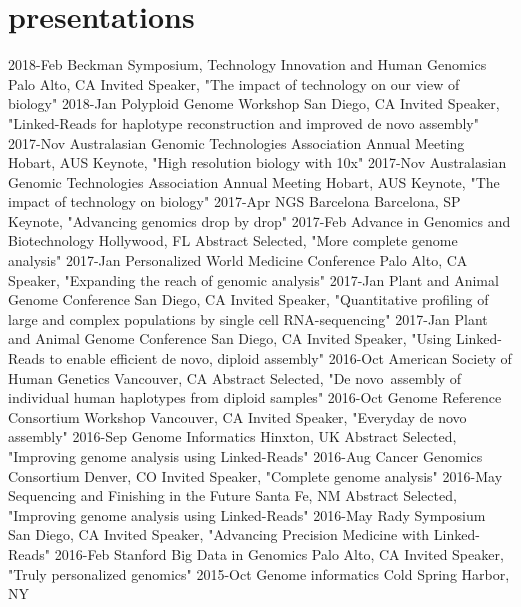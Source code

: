 \documentclass[]{dmc-cv} %
\begin{document}
\section{presentations}
\begin{entrylist}
\entry
{2018-Feb}
{Beckman Symposium, Technology Innovation and Human Genomics}
{Palo Alto, CA}
{Invited Speaker, "The impact of technology on our view of biology"}
\entry
{2018-Jan}
{Polyploid Genome Workshop}
{San Diego, CA}
{Invited Speaker, "Linked-Reads for haplotype reconstruction and improved de novo assembly"}
\entry
{2017-Nov}
{Australasian Genomic Technologies Association Annual Meeting}
{Hobart, AUS}
{Keynote, "High resolution biology with 10x"}
\entry
{2017-Nov}
{Australasian Genomic Technologies Association Annual Meeting}
{Hobart, AUS}
{Keynote, "The impact of technology on biology"}
\entry
{2017-Apr}
{NGS Barcelona}
{Barcelona, SP}
{Keynote, "Advancing genomics drop by drop"}
\entry
{2017-Feb}
{Advance in Genomics and Biotechnology}
{Hollywood, FL}
{Abstract Selected, "More complete genome analysis"}
\entry
{2017-Jan}
{Personalized World Medicine Conference}
{Palo Alto, CA}
{Speaker, "Expanding the reach of genomic analysis"}
\entry
{2017-Jan}
{Plant and Animal Genome Conference}
{San Diego, CA}
{Invited Speaker, "Quantitative profiling of large and complex populations by single cell RNA-sequencing"}
\entry
{2017-Jan}
{Plant and Animal Genome Conference}
{San Diego, CA}
{Invited Speaker, "Using Linked-Reads to enable efficient de novo, diploid assembly"}
\entry
{2016-Oct}
{American Society of Human Genetics}
{Vancouver, CA}
{Abstract Selected, "De novo assembly of individual human haplotypes from diploid samples"}
\entry
{2016-Oct}
{Genome Reference Consortium Workshop}
{Vancouver, CA}
{Invited Speaker, "Everyday de novo assembly"}
\entry
{2016-Sep}
{Genome Informatics}
{Hinxton, UK}
{Abstract Selected, "Improving genome analysis using Linked-Reads"}
\entry
{2016-Aug}
{Cancer Genomics Consortium}
{Denver, CO}
{Invited Speaker, "Complete genome analysis"}
\entry
{2016-May}
{Sequencing and Finishing in the Future}
{Santa Fe, NM}
{Abstract Selected, "Improving genome analysis using Linked-Reads"}
\entry
{2016-May}
{Rady Symposium}
{San Diego, CA}
{Invited Speaker, "Advancing Precision Medicine with Linked-Reads"}
\entry
{2016-Feb}
{Stanford Big Data in Genomics}
{Palo Alto, CA}
{Invited Speaker, "Truly personalized genomics"}
\entry
{2015-Oct}
{Genome informatics}
{Cold Spring Harbor, NY}

\end{entrylist}
\end{document}
